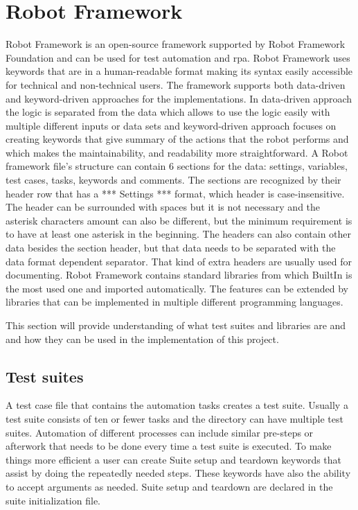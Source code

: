 \section{Robot Framework}
Robot Framework is an open-source framework supported by Robot Framework Foundation and can be used for test automation and \gls{rpa}.
Robot Framework uses keywords that are in a human-readable format making its syntax easily accessible for technical and non-technical users.
The framework supports both data-driven and keyword-driven approaches for the implementations.
In data-driven approach the logic is separated from the data which allows to use the logic easily with multiple different inputs or data sets and keyword-driven approach focuses on creating keywords that give summary of the actions that the robot performs and which makes the maintainability, and readability more straightforward.
A Robot framework file's structure can contain 6 sections for the data: settings, variables, test cases, tasks, keywords and comments.
The sections are recognized by their header row that has a *** Settings *** format, which header is case-insensitive. The header can be surrounded with spaces but it is not necessary and the asterisk characters amount can also be different, but the minimum requirement is to have at least one asterisk in the beginning.
The headers can also contain other data besides the section header, but that data needs to be separated with the data format dependent separator.
That kind of extra headers are usually used for documenting.
Robot Framework contains standard libraries from which BuiltIn is the most used one and imported automatically.
The features can be extended by libraries that can be implemented in multiple different programming languages.

This section will provide understanding of what test suites and libraries are and and how they can be used in the implementation of this project.

\subsection{Test suites}
A test case file that contains the automation tasks creates a test suite. Usually a test suite consists of ten or fewer tasks and the directory can have multiple test suites.
Automation of different processes can include similar pre-steps or afterwork that needs to be done every time a test suite is executed.
To make things more efficient a user can create Suite setup and teardown keywords that assist by doing the repeatedly needed steps.
These keywords have also the ability to accept arguments as needed.
Suite setup and teardown are declared in the suite initialization file.

